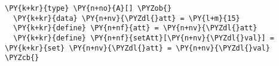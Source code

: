 \begin{Verbatim}[commandchars=\\\{\}]
\PY{k+kr}{type} \PY{n+no}{A}[] \PYZob{}
  \PY{k+kr}{data} \PY{n+nv}{\PYZdl{}att} = \PY{l+m}{15}
  \PY{k+kr}{define} \PY{n+nf}{att} = \PY{n+nv}{\PYZdl{}att}
  \PY{k+kr}{define} \PY{n+nf}{setAtt}[\PY{n+nv}{\PYZdl{}val}] = \PY{k+kr}{set} \PY{n+nv}{\PYZdl{}att} = \PY{n+nv}{\PYZdl{}val}
\PYZcb{}
\end{Verbatim}
